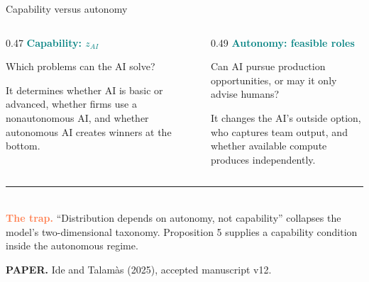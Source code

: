 \documentclass[aspectratio=169,11pt]{beamer}
\newcommand{\key}[1]{\textcolor{Teal}{\textbf{#1}}}
\newcommand{\caveat}[1]{\textcolor{Coral}{\textbf{#1}}}
\newcommand{\sourcefoot}{\scriptsize\color{Muted}\textbf{PAPER.} Ide and Talam\`as (2025), accepted manuscript v12.}
\begin{document}
\begin{frame}{Capability versus autonomy}
\small
\begin{columns}[T,totalwidth=\textwidth]
\begin{column}{0.47\textwidth}
  \key{Capability: $z_{AI}$}

  Which problems can the AI solve?

  \vspace{0.22cm}
  It determines whether AI is basic or advanced, whether firms use a
  nonautonomous AI, and whether autonomous AI creates winners at the bottom.
\end{column}
\begin{column}{0.49\textwidth}
  \key{Autonomy: feasible roles}

  Can AI pursue production opportunities, or may it only advise humans?

  \vspace{0.22cm}
  It changes the AI's outside option, who captures team output, and whether
  available compute produces independently.
\end{column}
\end{columns}

\vfill
{\color{Coral}\rule{\textwidth}{0.8pt}}\\[-0.02cm]
\caveat{The trap.} ``Distribution depends on autonomy, not capability''
collapses the model's two-dimensional taxonomy. Proposition 5 supplies a
capability condition inside the autonomous regime.

\vspace{0.08cm}
\sourcefoot
\end{frame}
\end{document}
